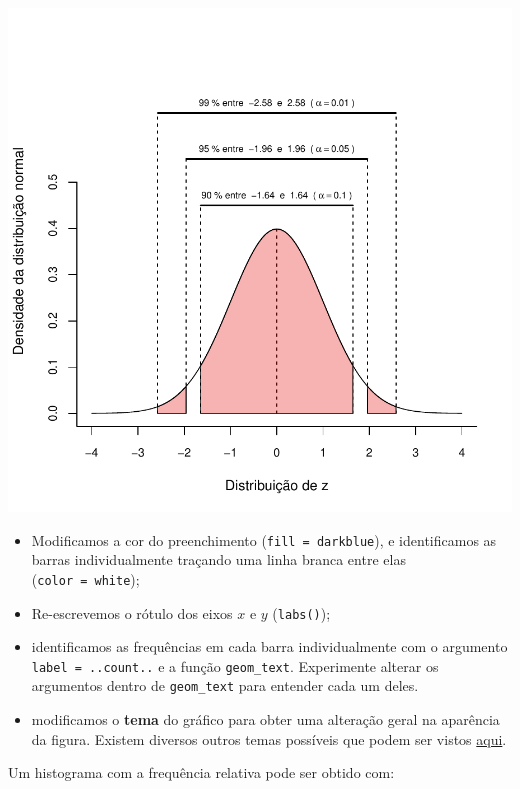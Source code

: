 \documentclass[
]{book}
\begin{document}
\includegraphics{probest-cambientais_files/figure-latex/unnamed-chunk-110-1.pdf}

\begin{itemize}
\item
  Modificamos a cor do preenchimento (\texttt{fill\ =\ \textquotesingle{}darkblue\textquotesingle{}}), e identificamos as barras individualmente traçando uma linha branca entre elas (\texttt{color\ =\ \textquotesingle{}white\textquotesingle{}});
\item
  Re-escrevemos o rótulo dos eixos \(x\) e \(y\) (\texttt{labs()});
\item
  identificamos as frequências em cada barra individualmente com o argumento \texttt{label\ =\ ..count..} e a função \texttt{geom\_text}. Experimente alterar os argumentos dentro de \texttt{geom\_text} para entender cada um deles.
\item
  modificamos o \textbf{tema} do gráfico para obter uma alteração geral na aparência da figura. Existem diversos outros temas possíveis que podem ser vistos \href{https://ggplot2.tidyverse.org/reference/ggtheme.html}{aqui}.
\end{itemize}

Um histograma com a frequência relativa pode ser obtido com:
\end{document}

